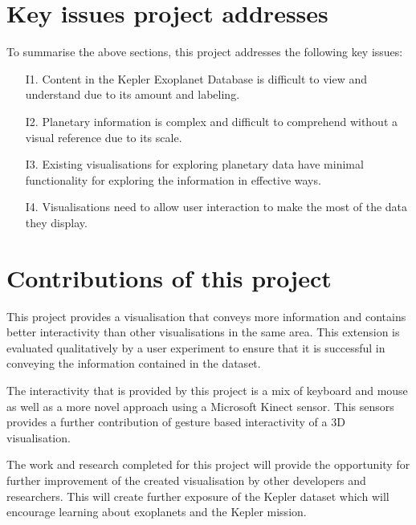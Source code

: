 \section{Key issues project addresses}
To summarise the above sections, this project addresses the following key
issues:
\begin{enumerate}
 \item[I1.] Content in the Kepler Exoplanet Database is difficult to view and
understand due to its amount and labeling.
 \item[I2.] Planetary information is complex and difficult to comprehend without
a visual reference due to its scale.
 \item[I3.] Existing visualisations for exploring planetary data have minimal
functionality for exploring the information in effective ways.
 \item[I4.] Visualisations need to allow user interaction to make the most of
the data they display.
\end{enumerate}

\section{Contributions of this project}
This project provides a visualisation that conveys more information and
contains better interactivity than other visualisations in the same area. This
extension is evaluated qualitatively by a user experiment to ensure that it
is successful in conveying the information contained in the dataset.

The interactivity that is provided by this project is a mix of keyboard and
mouse as well as a more novel approach using a Microsoft Kinect sensor. This
sensors provides a further contribution of gesture based interactivity of a 3D
visualisation.

The work and research completed for this project will provide the opportunity
for further improvement of the created visualisation by other developers and
researchers. This will create further exposure of the Kepler dataset which will
encourage learning about exoplanets and the Kepler mission.
